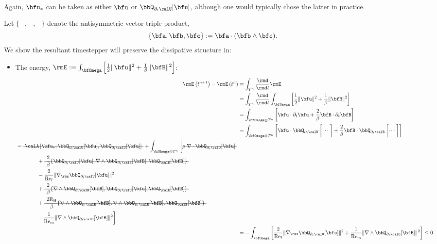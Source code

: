     Again, $\bfu_{*}$ can be taken as either $\bfu$ or $\bbQ_{\partial_{t}\calU}[\bfu]$, although one would typically chose the latter in practice.

    \shortline

    Let $\{-, -, -\}$ denote the antisymmetric vector triple product,
    \begin{equation}
        \{\bfa, \bfb, \bfc\}  :=  \bfa\cdot(\bfb\wedge\bfc).
    \end{equation}
    We show the resultant timestepper will preserve the dissipative structure in:
    \begin{itemize}
        \item  The energy, $\rmE  :=  \int_{\bfOmega}\left[\frac{1}{2}\|\bfu\|^{2} + \frac{1}{\beta}\|\bfB\|^{2}\right]$:
        \begin{align}
                \rmE\left(t^{n + 1}\right) - \rmE\left(t^{n}\right)
                &=  \int_{T^{n}}\frac{\rmd}{\rmd t}\rmE  \\
                &=  \int_{T^{n}}\frac{\rmd}{\rmd t}\int_{\bfOmega}\left[\frac{1}{2}\|\bfu\|^{2} + \frac{1}{\beta}\|\bfB\|^{2}\right]  \\
                &=  \int_{\bfOmega\otimes T^{n}}\left[\bfu\cdot\partial_{t}\bfu + \frac{2}{\beta}\bfB\cdot\partial_{t}\bfB\right]  \\
                &=  \int_{\bfOmega\otimes T^{n}}\left[\bfu\cdot\bbQ_{\partial_{t}\calU}\left[\cdots\tall\right] + \frac{2}{\beta}\bfB\cdot\bbQ_{\partial_{t}\calB}\left[\cdots\tall\right]\right]  \\
            \begin{split}
                &=  \mst{\calA\left[\bfu_{*}; \bbQ_{\partial_{t}\calU}[\bfu], \bbQ_{\partial_{t}\calU}[\bfu]\right]} + \int_{\bfOmega\otimes T^{n}}\left[p\mst{\nabla\cdot\bbQ_{\partial_{t}\calU}[\bfu]}\tall\right.  \\
                &\qquad\qquad+ \mst{\frac{2}{\beta}\{\bbQ_{\partial_{t}\calU}[\bfu], \nabla\wedge\bbQ_{\partial_{t}\calB}[\bfB], \bbQ_{\calE}[\bfB]\}}  \\
                &\qquad\qquad- \frac{2}{\rmRef}\|\nabla_{\rms}\bbQ_{\partial_{t}\calU}[\bfu]\|^{2}  \\
                &\qquad\qquad+ \mst{\frac{2}{\beta}\{\nabla\wedge\bbQ_{\partial_{t}\calB}[\bfB], \bbQ_{\partial_{t}\calU}[\bfu], \bbQ_{\calE}[\bfB]\}}  \\
                &\qquad\qquad+ \mst{\frac{2\rmRH}{\beta}\{\nabla\wedge\bbQ_{\partial_{t}\calB}[\bfB], \nabla\wedge\bbQ_{\partial_{t}\calB}[\bfB], \bbQ_{\calE}[\bfB]\}}  \\
                &\qquad\qquad\left.- \frac{1}{\rmRem}\|\nabla\wedge\bbQ_{\partial_{t}\calB}[\bfB]\|^{2}\right]
            \end{split}  \\
                &=  - \int_{\bfOmega}\left[\frac{2}{\rmRef}\|\nabla_{\rms}\bbQ_{\partial_{t}\calU}[\bfu]\|^{2} + \frac{1}{\rmRem}\|\nabla\wedge\bbQ_{\partial_{t}\calB}[\bfB]\|^{2}\right]  \leq  0
        \end{align}
        

\end{itemize}
